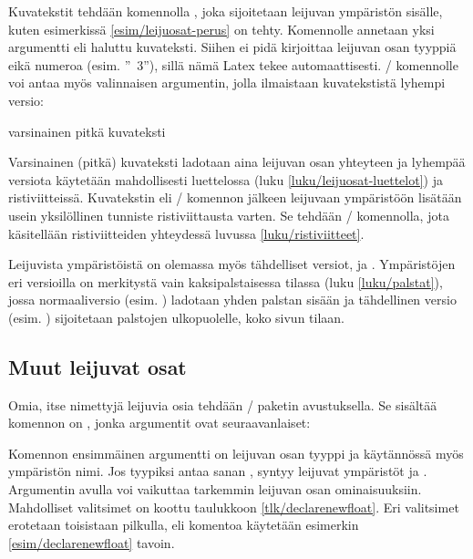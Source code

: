 Kuvatekstit tehdään komennolla , joka sijoitetaan
leijuvan ympäristön sisälle, kuten esimerkissä
\ref{esim/leijuosat-perus} on tehty. Komennolle annetaan yksi argumentti
eli haluttu kuvateksti. Siihen ei pidä kirjoittaa leijuvan osan tyyppiä
eikä numeroa (esim. ''\tablename~3''), sillä nämä Latex tekee
automaattisesti. \-/ komennolle voi antaa myös
valinnaisen argumentin, jolla ilmaistaan kuvatekstistä lyhempi versio:

\begin{koodilohkosis}
\caption[lyhyt kuvateksti]{varsinainen pitkä kuvateksti}
\end{koodilohkosis}

Varsinainen (pitkä) kuvateksti ladotaan aina leijuvan osan yhteyteen ja
lyhempää versiota käytetään mahdollisesti luettelossa (luku
\ref{luku/leijuosat-luettelot}) ja ristiviitteissä. Kuvatekstin eli
\-/ komennon jälkeen leijuvaan ympäristöön lisätään
usein yksilöllinen tunniste ristiviittausta varten. Se tehdään
\-/ komennolla, jota käsitellään ristiviitteiden
yhteydessä luvussa \ref{luku/ristiviitteet}.

Leijuvista ympäristöistä on olemassa myös tähdelliset versiot,
 ja . Ympäristöjen eri versioilla
on merkitystä vain kaksipalstaisessa tilassa (luku \ref{luku/palstat}),
jossa normaaliversio (esim. ) ladotaan yhden palstan
sisään ja tähdellinen versio (esim. ) sijoitetaan
palstojen ulkopuolelle, koko sivun tilaan.

\subsection{Muut leijuvat osat}
\label{luku/leijuosat-omat}

Omia, itse nimettyjä leijuvia osia tehdään \-/
paketin avustuksella. Se sisältää komennon on
, jonka argumentit ovat seuraavanlaiset:

\begin{koodilohkosis}
\end{koodilohkosis}

Komennon ensimmäinen argumentti  on leijuvan osan tyyppi
ja käytännössä myös ympäristön nimi. Jos tyypiksi antaa sanan
, syntyy leijuvat ympäristöt  ja
. Argumentin  avulla voi
vaikuttaa tarkemmin leijuvan osan ominaisuuksiin. Mahdolliset valitsimet
on koottu taulukkoon \ref{tlk/declarenewfloat}. Eri valitsimet erotetaan
toisistaan pilkulla, eli komentoa käytetään esimerkin
\ref{esim/declarenewfloat} tavoin.

